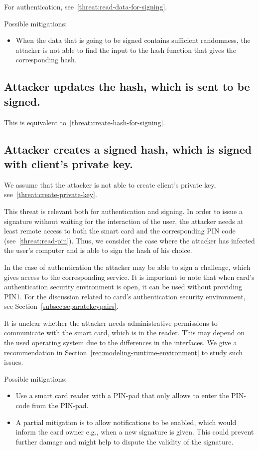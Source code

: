 For authentication, see~\ref{threat:read-data-for-signing}.

Possible mitigations:
\begin{itemize}
\item When the data that is going to be signed contains sufficient randomness, the attacker is not able to find the input to the hash function that gives the corresponding hash. 
\end{itemize}


\subsection{Attacker updates the hash, which is sent to be signed.}
\label{threat:update-hash-for-signing}
This is equivalent to~\ref{threat:create-hash-for-signing}.





\subsection{Attacker creates a signed hash, which is signed with client's private key.}
\label{threat:create-signed-hash}
We assume that the attacker is not able to create client's private key, see~\ref{threat:create-private-key}.

This threat is relevant both for authentication and signing. In order to issue a signature without waiting for the interaction of the user, the attacker needs at least remote access to both the smart card and the corresponding PIN code (see~\ref{threat:read-pin}). Thus, we consider the case where the attacker has infected the user's computer and is able to sign the hash of his choice.

In the case of authentication the attacker may be able to sign a challenge, which gives access to the corresponding service. It is important to note that when card's authentication security environment is open, it can be used without providing PIN1. For the discussion related to card's authentication security environment, see Section~\ref{subsec:separatekeypairs}.


It is unclear whether the attacker needs administrative permissions to communicate with the smart card, which is in the reader. This may depend on the used operating system due to the differences in the interfaces. We give a recommendation in Section~\ref{rec:modeling-runtime-environment} to study such issues.

Possible mitigations:
\begin{itemize}
\item Use a smart card reader with a PIN-pad that only allows to enter the PIN-code from the PIN-pad.
\item A partial mitigation is to allow notifications to be enabled, which would inform the card owner e.g., when a new signature is given. This could prevent further damage and might help to dispute the validity of the signature.
\end{itemize}


